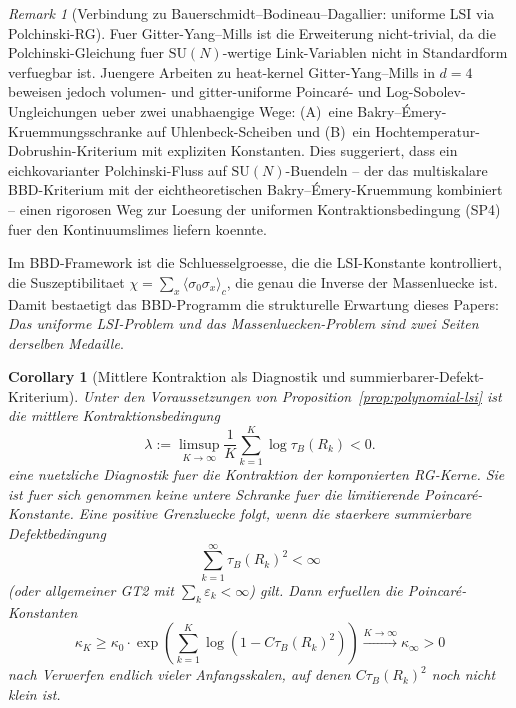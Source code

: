 \documentclass[12pt,a4paper]{article}
\theoremstyle{definition}
\theoremstyle{plain}
\newtheorem{corollary}[definition]{Corollary}
\theoremstyle{remark}
\newtheorem{remark}[definition]{Remark}
\begin{document}
\begin{remark}[Verbindung zu Bauerschmidt--Bodineau--Dagallier: uniforme LSI via Polchinski-RG]
Fuer Gitter-Yang--Mills ist die Erweiterung nicht-trivial, da die Polchinski-Gleichung fuer $\mathrm{SU}(N)$-wertige Link-Variablen nicht in Standardform verfuegbar ist. Juengere Arbeiten zu heat-kernel Gitter-Yang--Mills in $d=4$ beweisen jedoch volumen- und gitter-uniforme Poincar\'e- und Log-Sobolev-Ungleichungen ueber zwei unabhaengige Wege: (A)~eine Bakry--\'Emery-Kruemmungsschranke auf Uhlenbeck-Scheiben und (B)~ein Hochtemperatur-Dobrushin-Kriterium mit expliziten Konstanten. Dies suggeriert, dass ein eichkovarianter Polchinski-Fluss auf $\mathrm{SU}(N)$-Buendeln -- der das multiskalare BBD-Kriterium mit der eichtheoretischen Bakry--\'Emery-Kruemmung kombiniert -- einen rigorosen Weg zur Loesung der uniformen Kontraktionsbedingung (SP4) fuer den Kontinuumslimes liefern koennte.

Im BBD-Framework ist die Schluesselgroesse, die die LSI-Konstante kontrolliert, die Suszeptibilitaet $\chi = \sum_x \langle \sigma_0 \sigma_x \rangle_c$, die genau die Inverse der Massenluecke ist. Damit bestaetigt das BBD-Programm die strukturelle Erwartung dieses Papers: \emph{Das uniforme LSI-Problem und das Massenluecken-Problem sind zwei Seiten derselben Medaille}.
\end{remark}

\begin{corollary}[Mittlere Kontraktion als Diagnostik und summierbarer-Defekt-Kriterium]\label{cor:kingman-gap}
Unter den Voraussetzungen von Proposition~\ref{prop:polynomial-lsi} ist die mittlere Kontraktionsbedingung
\begin{equation}\label{eq:mean-contraction}
  \lambda := \limsup_{K \to \infty} \frac{1}{K} \sum_{k=1}^{K} \log \tau_B(R_k) < 0.
\end{equation}
eine nuetzliche Diagnostik fuer die Kontraktion der komponierten RG-Kerne. Sie ist fuer sich genommen keine untere Schranke fuer die limitierende Poincar\'e-Konstante. Eine positive Grenzluecke folgt, wenn die staerkere summierbare Defektbedingung
\begin{equation}\label{eq:summable-birkhoff-defect}
  \sum_{k=1}^{\infty} \tau_B(R_k)^2 < \infty
\end{equation}
(oder allgemeiner GT2 mit $\sum_k \varepsilon_k < \infty$) gilt. Dann erfuellen die Poincar\'e-Konstanten
\begin{equation}
  \kappa_K \geq \kappa_0 \cdot \exp\!\left(\sum_{k=1}^{K} \log(1 - C \tau_B(R_k)^2)\right) \xrightarrow{K \to \infty} \kappa_\infty > 0
\end{equation}
nach Verwerfen endlich vieler Anfangsskalen, auf denen $C\tau_B(R_k)^2$ noch nicht klein ist.
\end{corollary}
\end{document}
